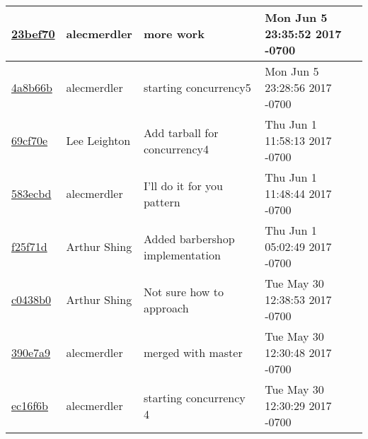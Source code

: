 \begin{tabular}{l l l l}
\href{https://github.com/alecmerdler/cs-444-group-119/commit/23bef706b9aa65a8a6c150131ec8baa2c97ce181}{23bef70} & alecmerdler & more work & Mon Jun 5 23:35:52 2017 -0700\\\hline
\href{https://github.com/alecmerdler/cs-444-group-119/commit/4a8b66bf7c19f0edef2378adf32d3f473b3a6abf}{4a8b66b} & alecmerdler & starting concurrency5 & Mon Jun 5 23:28:56 2017 -0700\\\hline
\href{https://github.com/alecmerdler/cs-444-group-119/commit/69cf70e6130d3129f7754feedf61ba70ed5453f8}{69cf70e} & Lee Leighton & Add tarball for concurrency4 & Thu Jun 1 11:58:13 2017 -0700\\\hline
\href{https://github.com/alecmerdler/cs-444-group-119/commit/583ecbdff859096a4521cf0b86a25b3ef0121b2e}{583ecbd} & alecmerdler & I'll do it for you pattern & Thu Jun 1 11:48:44 2017 -0700\\\hline
\href{https://github.com/alecmerdler/cs-444-group-119/commit/f25f71d59d6fe961e77c659c54655b57acb4765e}{f25f71d} & Arthur Shing & Added barbershop implementation & Thu Jun 1 05:02:49 2017 -0700\\\hline
\href{https://github.com/alecmerdler/cs-444-group-119/commit/c0438b035bac02f4a0b2bc5c5789690eabb88d0d}{c0438b0} & Arthur Shing & Not sure how to approach & Tue May 30 12:38:53 2017 -0700\\\hline
\href{https://github.com/alecmerdler/cs-444-group-119/commit/390e7a9b7c0fd15d4c15d2d6042b00ac2550266d}{390e7a9} & alecmerdler & merged with master & Tue May 30 12:30:48 2017 -0700\\\hline
\href{https://github.com/alecmerdler/cs-444-group-119/commit/ec16f6bf04069d333fec28f2014be9c952733564}{ec16f6b} & alecmerdler & starting concurrency 4 & Tue May 30 12:30:29 2017 -0700\\\hline\end{tabular}
